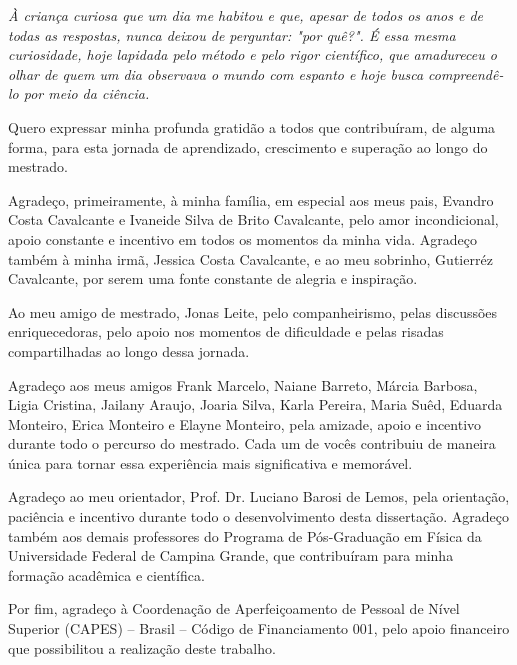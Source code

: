 \begin{dedicatoria}
   \vspace*{\fill}
   \centering
   \noindent
   \textit{ À criança curiosa que um dia me habitou e que, apesar de todos os anos e de todas as respostas, nunca deixou de perguntar: "por quê?". É essa mesma curiosidade, hoje lapidada pelo método e pelo rigor científico, que amadureceu o olhar de quem um dia observava o mundo com espanto e hoje busca compreendê-lo por meio da ciência.} \vspace*{\fill}
\end{dedicatoria}


\begin{agradecimentos}

Quero expressar minha profunda gratidão a todos que contribuíram, de alguma forma, para esta jornada de aprendizado, crescimento e superação ao longo do mestrado.

Agradeço, primeiramente, à minha família, em especial aos meus pais, Evandro Costa Cavalcante e Ivaneide Silva de Brito Cavalcante, pelo amor incondicional, apoio constante e incentivo em todos os momentos da minha vida. Agradeço também à minha irmã, Jessica Costa Cavalcante, e ao meu sobrinho, Gutierréz Cavalcante, por serem uma fonte constante de alegria e inspiração.

Ao meu amigo de mestrado, Jonas Leite, pelo companheirismo, pelas discussões enriquecedoras, pelo apoio nos momentos de dificuldade e pelas risadas compartilhadas ao longo dessa jornada.

Agradeço aos meus amigos Frank Marcelo, Naiane Barreto, Márcia Barbosa, Ligia Cristina, Jailany Araujo, Joaria Silva, Karla Pereira, Maria Suêd, Eduarda Monteiro, Erica Monteiro e Elayne Monteiro, pela amizade, apoio e incentivo durante todo o percurso do mestrado. Cada um de vocês contribuiu de maneira única para tornar essa experiência mais significativa e memorável.

Agradeço ao meu orientador, Prof. Dr. Luciano Barosi de Lemos, pela orientação, paciência e incentivo durante todo o desenvolvimento desta dissertação. Agradeço também aos demais professores do Programa de Pós-Graduação em Física da Universidade Federal de Campina Grande, que contribuíram para minha formação acadêmica e científica.

Por fim, agradeço à Coordenação de Aperfeiçoamento de Pessoal de Nível Superior (CAPES) – Brasil – Código de Financiamento 001, pelo apoio financeiro que possibilitou a realização deste trabalho.
\end{agradecimentos}

